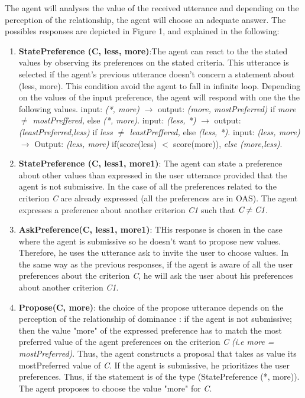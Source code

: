 \documentclass{llncs}
\begin{document}
	\par The agent will analyses the value of the received utterance and depending on the perception of the relationship, the agent will choose  an adequate answer. The possibles responses are depicted in Figure 1, and explained in the following: 
	\begin{enumerate}
		\item \textbf{StatePreference (C, less, more)}:The agent can react to the the stated values by observing its preferences on the stated criteria. This utterance is selected if the agent's previous utterance doesn't concern a statement about (less, more). This condition avoid the agent to fall in infinite loop.  Depending on the values of the input preference, the agent will respond with one the the following values. 
			\subitem input: \textit{(*, more)} $\rightarrow$ 
				output: \textit{(more, mostPreferred)} if \textit{more $\not = $ mostPreffered,} else \textit{(*, more)}.
			\subitem input: \textit{(less, *)} $\rightarrow$ 
				output: \textit{(leastPreferred,less)} if \textit{less $\not = $ leastPreffered,} else \textit{(less, *)}.
			\subitem input: \textit{(less, more)} $\rightarrow$ Output:  \textit{(less, more)} if(score(less) $<$ score(more)), \textit{else (more,less)}.
			
		\item \textbf{StatePreference (C, less1, more1)}: The agent can state a preference about other values than expressed in the user utterance provided that the agent is not submissive. In the case of all the preferences related to the criterion \emph{C} are already expressed (all the preferences are in OAS). The agent expresses a preference about another criterion \emph{C1} such that $\emph{C} \not = \emph{C1}$.
		
		\item \textbf{AskPreference(C, less1, more1)}: THis response is chosen in the case where the agent is submissive so he doesn't want to propose new values. Therefore, he uses the utterance ask to invite the user to choose values. In the same way as the previous responses, if the agent is aware of all the user preferences about the criterion \emph{C}, he will ask the user about his preferences about another criterion \emph{C1}.
		
		
		\item  \textbf{Propose(C, more)}: the choice of the propose utterance depends on the perception of the relationship of dominance : 
			\subitem if the agent is not submissive; then  the value "more" of the expressed preference has to match the most preferred value of the agent preferences on the criterion \emph{C} \textit{(i.e more = mostPreferred)}. Thus, the agent constructs a proposal that takes as value its mostPreferred value of  \emph{C}.
			\subitem If the agent is submissive, he prioritizes the user preferences. Thus, if the statement is of the type (StatePreference (*, more)). The agent proposes to choose the value "more" for \emph{C}.
	\end{enumerate}
\end{document}
